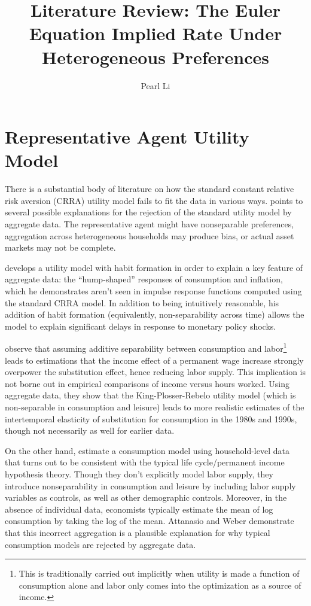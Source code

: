 \documentclass{hw}
\begin{document}
\title{Literature Review: The Euler Equation Implied Rate Under Heterogeneous Preferences}
\author{Pearl Li}
\maketitle

\section{Representative Agent Utility Model}
There is a substantial body of literature on how the standard constant relative risk aversion (CRRA) utility model fails to fit the data in various ways. \cite{parker99} points to several possible explanations for the rejection of the standard utility model by aggregate data. The representative agent might have nonseparable preferences, aggregation across heterogeneous households may produce bias, or actual asset markets may not be complete.

\cite{fuhrer00} develops a utility model with habit formation in order to explain a key feature of aggregate data: the ``hump-shaped'' responses of consumption and inflation, which he demonstrates aren't seen in impulse response functions computed using the standard CRRA model. In addition to being intuitively reasonable, his addition of habit formation (equivalently, non-separability across time) allows the model to explain significant delays in response to monetary policy shocks.

\cite{basu02} observe that assuming additive separability between consumption and labor\footnote{This is traditionally carried out implicitly when utility is made a function of consumption alone and labor only comes into the optimization as a source of income.} leads to estimations that the income effect of a permanent wage increase strongly overpower the substitution effect, hence reducing labor supply. This implication is not borne out in empirical comparisons of income versus hours worked. Using aggregate data, they show that the King-Plosser-Rebelo utility model (which is non-separable in consumption and leisure) leads to more realistic estimates of the intertemporal elasticity of substitution for consumption in the 1980s and 1990s, though not necessarily as well for earlier data.

On the other hand, \cite{attanasio95} estimate a consumption model using household-level data that turns out to be consistent with the typical life cycle/permanent income hypothesis theory. Though they don't explicitly model labor supply, they introduce nonseparability in consumption and leisure by including labor supply variables as controls, as well as other demographic controls. Moreover, in the absence of individual data, economists typically estimate the mean of log consumption by taking the log of the mean. Attanasio and Weber demonstrate that this incorrect aggregation is a plausible explanation for why typical consumption models are rejected by aggregate data.
\end{document}
